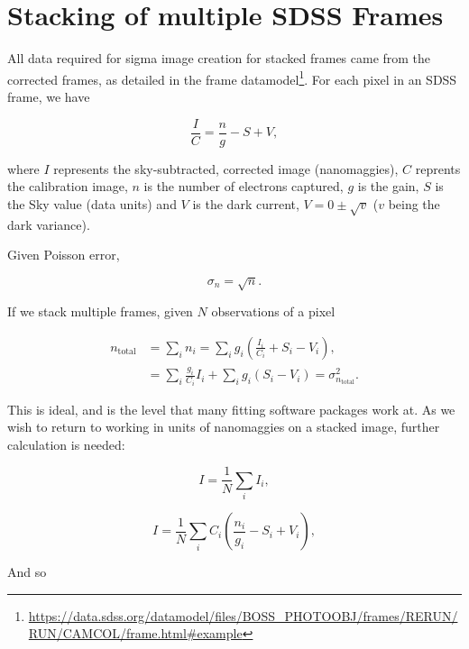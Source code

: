 \documentclass[../main.tex]{subfiles}
\begin{document}
\section{Stacking of multiple SDSS Frames}
\label{appendix:frame_stacking}

 All data required for sigma image creation for stacked frames came from the corrected frames, as detailed in the frame datamodel\footnote{\url{https://data.sdss.org/datamodel/files/BOSS_PHOTOOBJ/frames/RERUN/RUN/CAMCOL/frame.html\#example}}. For each pixel in an SDSS frame, we have

\begin{equation}
\frac{I}{C} = \frac{n}{g} - S + V,
\end{equation}

where $I$ represents the sky-subtracted, corrected image (nanomaggies), $C$ reprents the calibration image, $n$ is the number of electrons captured, $g$ is the gain, $S$ is the Sky value (data units) and $V$ is the dark current, $V = 0 ± \sqrt{v}$ ($v$ being the dark variance).

Given Poisson error,

\begin{equation}
\sigma_n = \sqrt{n}.
\end{equation}

If we stack multiple frames, given $N$ observations of a pixel

\begin{equation}
  \begin{aligned}
n_\mathrm{total} &= \sum_i{n_i} = \sum_i g_i\left(\frac{I_i}{C_i} + S_i - V_i\right),\\
                 &= \sum_{i}\frac{g_i}{C_i}I_i + \sum_i{g_i \left(S_i - V_i\right)} = \sigma_{n_\mathrm{total}}^2.
  \end{aligned}
\end{equation}

This is ideal, and is the level that many fitting software packages work at. As we wish to return to working in units of nanomaggies on a stacked image, further calculation is needed:

\begin{equation}
I = \frac{1}{N}\sum_i I_i,
\end{equation}

\begin{equation}
I = \frac{1}{N}\sum_i C_i\left(\frac{n_i}{g_i} - S_i + V_i\right),
\end{equation}

And so
\end{document}
